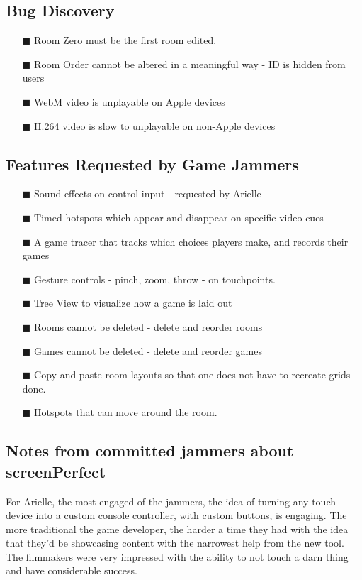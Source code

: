 \subsection{Bug Discovery}
\begin{itemize} 
\item[\tiny{$\blacksquare$}] Room Zero must be the first room edited.
\item[\tiny{$\blacksquare$}] Room Order cannot be altered in a meaningful way - ID is hidden from users
\item[\tiny{$\blacksquare$}] WebM video is unplayable on Apple devices
\item[\tiny{$\blacksquare$}] H.264 video is slow to unplayable on non-Apple devices
\end{itemize}


\subsection{Features Requested by Game Jammers}

\begin{itemize} 
\item[\tiny{$\blacksquare$}] Sound effects on control input - requested by Arielle
\item[\tiny{$\blacksquare$}] Timed hotspots which appear and disappear on specific video cues
\item[\tiny{$\blacksquare$}] A game tracer that tracks which choices players make, and records their games
\item[\tiny{$\blacksquare$}] Gesture controls - pinch, zoom, throw - on touchpoints.
\item[\tiny{$\blacksquare$}] Tree View to visualize how a game is laid out
\item[\tiny{$\blacksquare$}] Rooms cannot be deleted - delete and reorder rooms
\item[\tiny{$\blacksquare$}] Games cannot be deleted - delete and reorder games
\item[\tiny{$\blacksquare$}] Copy and paste room layouts so that one does not have to recreate grids - done.
\item[\tiny{$\blacksquare$}] Hotspots that can move around the room.
\end{itemize}

\subsection{Notes from committed jammers about screenPerfect}

For Arielle, the most engaged of the jammers, the idea of turning any touch device into a custom console controller, with custom buttons, is engaging. The more traditional the game developer, the harder a time they had with the idea that they'd be showcasing content with the narrowest help from the new tool. The filmmakers were very impressed with the ability to not touch a darn thing and have considerable success.
